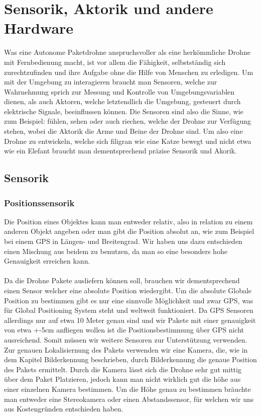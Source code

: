 \chapter{Sensorik, Aktorik und andere Hardware}
Was eine Autonome Paketdrohne anspruchsvoller als eine herkömmliche Drohne mit Fernbedienung macht, ist vor allem die Fähigkeit, selbstständig sich zurechtzufinden und ihre Aufgabe ohne die Hilfe von Menschen zu erledigen. Um mit der Umgebung zu interagieren braucht man Sensoren, welche zur Wahrnehmung sprich zur Messung und Kontrolle von Umgebungsvariablen dienen, als auch Aktoren, welche letztendlich die Umgebung, gesteuert durch elektrische Signale, beeinflussen können. Die Sensoren sind also die Sinne, wie zum Beispiel: fühlen, sehen oder auch riechen, welche der Drohne zur Verfügung stehen, wobei die Aktorik die Arme und Beine der Drohne sind. Um also eine Drohne zu entwickeln, welche sich filigran wie eine Katze bewegt und nicht etwa wie ein Elefant braucht man dementsprechend präzise Sensorik und Akorik.


\section{Sensorik}

\subsection{Positionssensorik}
Die Position eines Objektes kann man entweder relativ, also in relation zu einem anderen Objekt angeben oder man gibt die Position absolut an, wie zum Beispiel bei einem GPS in Längen- und Breitengrad. Wir haben uns dazu entschieden einen Mischung aus beidem zu benutzen, da man so eine besonders hohe Genauigkeit erreichen kann.
\\
\\ Da die Drohne Pakete ausliefern können soll, brauchen wir dementsprechend einen Sensor welcher eine absolute Position wiedergibt. Um die absolute Globale Position zu bestimmen gibt es nur eine sinnvolle Möglichkeit und zwar GPS, was für Global Positioning System steht und weltweit funktioniert. Da GPS Sensoren allerdings nur auf etwa 10 Meter genau sind und wir Pakete mit einer genauigkeit von etwa +-5cm anfliegen wollen ist die Positionsbestimmung über GPS nicht ausreichend. Somit müssen wir weitere Sensoren zur Unterstützung verwenden. Zur genauen Lokalisiernung des Pakets verwenden wir eine Kamera, die, wie in dem Kapitel Bilderkennung beschrieben, durch Bilderkennung die genaue Position des Pakets ermittelt. Durch die Kamera lässt sich die Drohne sehr gut mittig über dem Paket Platzieren, jedoch kann man nicht wirklich gut die höhe aus einer einzelnen Kamera bestimmen. Um die Höhe genau zu bestimmen bräuchte man entweder eine Stereokamera oder einen Abstandssensor, für welchen wir uns aus Kostengründen entschieden haben.

